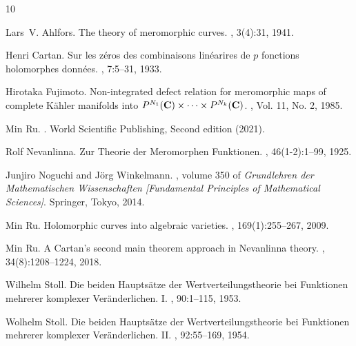 \documentclass[english, 12pt]{amsart}
\theoremstyle{plain}
\theoremstyle{remark}
\numberwithin{equation}{section}
\theoremstyle{plain}
\theoremstyle{named}
\begin{document}
\begin{center}

\begin{thebibliography}{10}
			
Lars~V. Ahlfors.
\newblock The theory of meromorphic curves.
, 3(4):31, 1941.
			
			Henri Cartan.
			\newblock Sur les z\'{e}ros des combinaisons lin\'{e}arires de $p$ fonctions
			holomorphes donn\'{e}es.
			, 7:5--31, 1933.
			
			Hirotaka Fujimoto.
			\newblock Non-integrated defect relation for meromorphic maps of complete K\"{a}hler manifolds into {$P^{N_1}({\bf C})\times\dots\times P^{N_k}({\bf C})$}.
			, Vol. 11, No. 2, 1985.
			
	Min Ru.
	.
	\newblock  World Scientific Publishing, Second edition (2021).
			
	
			Rolf Nevanlinna.
			\newblock Zur {T}heorie der {M}eromorphen {F}unktionen.
			, 46(1-2):1--99, 1925.
			
				
			Junjiro Noguchi and J\"{o}rg Winkelmann.
			, volume 350 of {\em Grundlehren der Mathematischen
				Wissenschaften [Fundamental Principles of Mathematical Sciences]}.
			\newblock Springer, Tokyo, 2014.
			
			Min Ru.
			\newblock Holomorphic curves into algebraic varieties.
			, 169(1):255--267, 2009.
			
			Min Ru.
			\newblock A {C}artan's second main theorem approach in {N}evanlinna theory.
			, 34(8):1208--1224, 2018.
			
				
			Wilhelm Stoll.
			\newblock Die beiden {H}aupts\"{a}tze der {W}ertverteilungstheorie bei
			{F}unktionen mehrerer komplexer {V}er\"{a}nderlichen. {I}.
			, 90:1--115, 1953.
			
			Wolhelm Stoll.
			\newblock Die beiden {H}aupts\"{a}tze der {W}ertverteilungstheorie bei
			{F}unktionen mehrerer komplexer {V}er\"{a}nderlichen. {II}.
			, 92:55--169, 1954.
			

\end{thebibliography}
\end{center}
\end{document}
